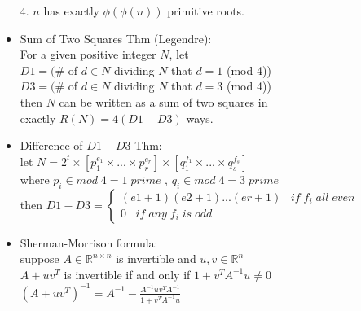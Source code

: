\begin{itemize}
  4. $n$ has exactly $\phi(\phi(n))$ primitive roots.
\item Sum of Two Squares Thm (Legendre):\\
  For a given positive integer $N$, let\\
  $D1 = (\#$ of $d \in N$ dividing $N$ that $d=1$ (mod 4))\\
  $D3 = (\#$ of $d \in N$ dividing $N$ that $d=3$ (mod 4))\\
  then $N$ can be written as a sum of two squares in\\
  exactly $R(N) = 4(D1-D3)$ ways.
\item Difference of $D1-D3$ Thm:\\
  let $N=2^t \times [p_1^{e_1} \times ...\times p_r^{e_r}] \times [q_1^{f_1} \times ...\times q_s^{f_s}]$\\
  where $p_i \in mod\;4 = 1\;prime$ , $q_i \in mod\;4 = 3\;prime$\\
  then $D1 - D3 = \begin{cases}(e1+1)(e2+1)...(er+1)\;\;\;if\;f_i\;all\;even\\0\;\;\;if\;any\;f_i\;is\;odd\end{cases}$
\item Sherman-Morrison formula:\\
  suppose $A \in \mathbb{R}^{n\times n}$ is invertible and $u,v \in \mathbb{R}^n$\\
  $A + uv^T$ is invertible if and only if $1 + v^TA^{-1}u \ne 0$\\
  $(A + uv^T)^{-1} = A^{-1} - \frac{A^{-1}uv^TA^{-1}}{1+v^TA^{-1}u}$\\
\end{itemize}
